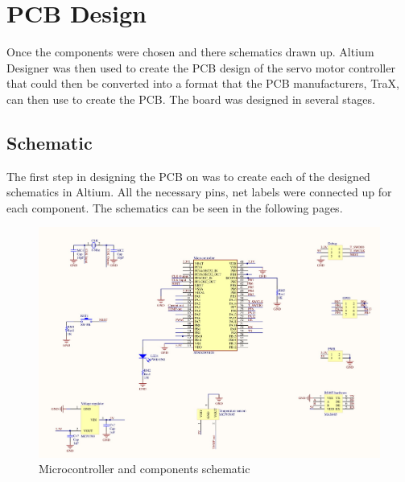 \chapter{PCB Design}
Once the components were chosen and there schematics drawn up. Altium Designer was then used to create the PCB design of the servo motor controller that could then be converted into a format that the PCB manufacturers, TraX, can then use to create the PCB. The board was designed in several stages.

\section{Schematic}
The first step in designing the PCB on was to create each of the designed schematics in Altium. All the necessary pins, net labels were connected up for each component. The schematics can be seen in the following pages.
\begin{figure}[H]
\centering
\includegraphics[width=1\textwidth]{Microsch.jpg}
\vspace{-5mm}
\caption{Microcontroller and components schematic}
\end{figure} 

